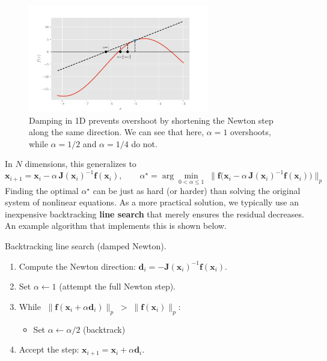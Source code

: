 \begin{figure}[h]
    \centering
    \includegraphics[width=0.7\textwidth]{figs/nle/damped_newton_verification.pdf}
    \caption{Damping in 1D prevents overshoot by shortening the Newton step along the same direction. We can see that here, $\alpha=1$ overshoots, while $\alpha=1/2$ and $\alpha=1/4$ do not.}
\end{figure}

In \(N\) dimensions, this generalizes to
\begin{equation}
\mathbf{x}_{i+1}=\mathbf{x}_i-\alpha\,\mathbf{J}(\mathbf{x}_i)^{-1}\mathbf{f}(\mathbf{x}_i),
\qquad
\alpha^\star=\arg\min_{0<\alpha\le 1}\;\bigl\|\mathbf{f}\bigl(\mathbf{x}_i-\alpha\,\mathbf{J}(\mathbf{x}_i)^{-1}\mathbf{f}(\mathbf{x}_i)\bigr)\bigr\|_p
\end{equation}
Finding the optimal \(\alpha^\star\) can be just as hard (or harder) than solving the original system of nonlinear equations. As a more practical solution, we typically use an inexpensive backtracking \textbf{line search} that merely ensures the residual decreases. An example algorithm that implements this is shown below.

\begin{algorithm}[H]
\caption{Backtracking line search (damped Newton).}
\begin{enumerate}
\item Compute the Newton direction: \(\mathbf{d}_i=-\mathbf{J}(\mathbf{x}_i)^{-1}\mathbf{f}(\mathbf{x}_i)\).
\item Set \(\alpha\leftarrow 1\) (attempt the full Newton step).
\item While \(\;\lVert \mathbf{f}(\mathbf{x}_i+\alpha\mathbf{d}_i)\rVert_p \;>\; \lVert \mathbf{f}(\mathbf{x}_i)\rVert_p:\)
\begin{itemize}
  \item Set \(\alpha \leftarrow \alpha/2\) \hfill (backtrack)
\end{itemize}
\item Accept the step: \(\mathbf{x}_{i+1}=\mathbf{x}_i+\alpha\mathbf{d}_i\).
\end{enumerate}
\end{algorithm}

